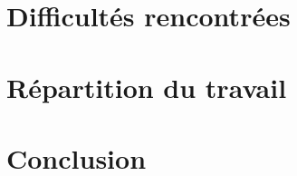 \documentclass{beamer}
\begin{document}
\section{Difficultés rencontrées}
\begin{frame}
\end{frame}


\section{Répartition du travail}
\begin{frame}
\end{frame}


\section{Conclusion}
\begin{frame}
\end{frame}
\end{document}
